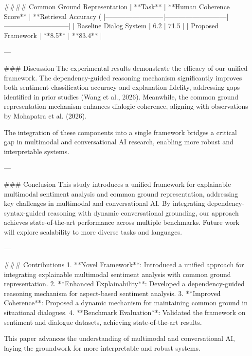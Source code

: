 #### Common Ground Representation
| **Task**                | **Human Coherence Score** | **Retrieval Accuracy (%
|--------------------------|---------------------------|-----------------------------|  
| Baseline Dialog System   | 6.2                      | 71.5                        |  
| Proposed Framework       | **8.5**                  | **83.4**                    |  

---

### Discussion
The experimental results demonstrate the efficacy of our unified framework. The dependency-guided reasoning mechanism significantly improves both sentiment classification accuracy and explanation fidelity, addressing gaps identified in prior studies (Wang et al., 2026). Meanwhile, the common ground representation mechanism enhances dialogic coherence, aligning with observations by Mohapatra et al. (2026).

The integration of these components into a single framework bridges a critical gap in multimodal and conversational AI research, enabling more robust and interpretable systems.

---

### Conclusion
This study introduces a unified framework for explainable multimodal sentiment analysis and common ground representation, addressing key challenges in multimodal and conversational AI. By integrating dependency-syntax-guided reasoning with dynamic conversational grounding, our approach achieves state-of-the-art performance across multiple benchmarks. Future work will explore scalability to more diverse tasks and languages.

---

### Contributions
1. **Novel Framework**: Introduced a unified approach for integrating explainable multimodal sentiment analysis with common ground representation.
2. **Enhanced Explainability**: Developed a dependency-guided reasoning mechanism for aspect-based sentiment analysis.
3. **Improved Coherence**: Proposed a dynamic mechanism for maintaining common ground in situational dialogues.
4. **Benchmark Evaluation**: Validated the framework on sentiment and dialogue datasets, achieving state-of-the-art results. 

This paper advances the understanding of multimodal and conversational AI, laying the groundwork for more interpretable and robust systems.
